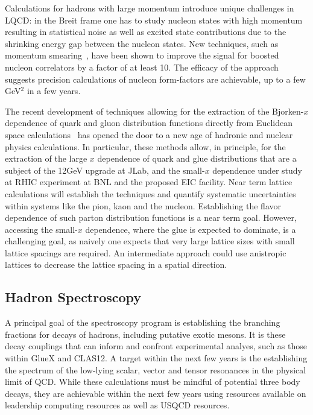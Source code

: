 Calculations for hadrons with large momentum introduce unique challenges in LQCD: in the Breit frame one 
has to study nucleon states with high momentum 
resulting in statistical noise as well as excited state contributions due to the
shrinking energy gap between the nucleon states.
New techniques, such as momentum smearing~\cite{Bali:2016lva,Syritsyn:2017jrc}, have been shown to improve
the signal for boosted nucleon correlators by a factor of at least 10. The efficacy of the approach suggests precision calculations of nucleon form-factors are achievable, up to a few GeV$^2$ in a few years.


The recent development of techniques allowing for the extraction of the Bjorken-$x$ dependence of quark and gluon distribution functions directly from Euclidean space calculations~\cite{Ji:2001wha} has opened the door to a new age of hadronic and nuclear physics calculations. In particular, these methods allow, in principle, for the extraction of the large $x$ dependence of quark and glue distributions that are a subject of the 12GeV upgrade at JLab, and the small-$x$ dependence under study at RHIC experiment at BNL and the proposed EIC facility. Near term  lattice calculations will establish the techniques and quantify systematic uncertainties within systems like the pion, kaon and the nucleon. Establishing the flavor dependence of such parton distribution functions is a near term goal. However, accessing the small-$x$ dependence, where the glue is expected to dominate, is a challenging goal, as naively one expects that very large lattice sizes with small lattice spacings are required. An intermediate approach could use anistropic lattices to decrease the lattice spacing in a spatial direction.%



\subsection{Hadron Spectroscopy}

A principal goal of the spectroscopy program is establishing the branching fractions for decays of hadrons, including putative exotic mesons. It is these decay couplings that can inform and confront experimental analyes, such as those within GlueX and CLAS12. A target within the next few years is the establishing the spectrum of the low-lying scalar, vector and tensor resonances in the physical limit of QCD. While these calculations must be mindful of potential three body decays, they are achievable within the next few years using resources available on leadership computing resources as well as USQCD resources.

